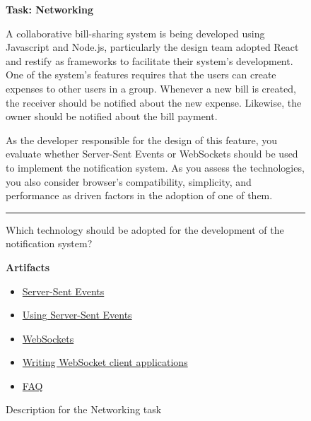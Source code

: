 \begin{figure}
\begin{mdframed}[backgroundcolor=gray!05] 
\begin{scriptsize}

{\large \textbf{Task: Networking}} \bigskip


A collaborative bill-sharing system is being developed using Javascript and Node.js, particularly the
design team adopted React and restify as frameworks to facilitate their system's development. One of the
system's features requires that the users can create expenses to other users in a group. Whenever a new
bill is created, the receiver should be notified about the new expense. Likewise, the owner should be
notified about the bill payment. \medskip

As the developer responsible for the design of this feature, you evaluate whether Server-Sent Events
or WebSockets should be used to implement the notification system. As you assess the technologies,
you also consider browser's compatibility, simplicity, and performance as driven factors in the adoption of
one of them.


\begin{center}
\rule{10cm}{0.4pt}
\end{center}

Which technology should be adopted for the development of the notification system?

\medskip

\textbf{Artifacts}

\begin{itemize}
    \item \href{https://developer.mozilla.org/en-US/docs/Web/API/EventSource}{Server-Sent Events}
    \item \href{https://developer.mozilla.org/en-US/docs/Web/API/Server-sent_events/Using_server-sent_events}{Using Server-Sent Events}
    \item \href{https://developer.mozilla.org/en-US/docs/Web/API/WebSockets_API}{WebSockets}
    \item \href{https://developer.mozilla.org/en-US/docs/Web/API/WebSockets_API/Writing_WebSocket_client_applications}{Writing WebSocket client applications}
    \item \href{https://stackoverflow.com/questions/5195452/websockets-vs-server-sent-events-eventsource}{FAQ}
\end{itemize}

\end{scriptsize}
\end{mdframed}
\caption{Description for the Networking task}
\end{figure}

    
